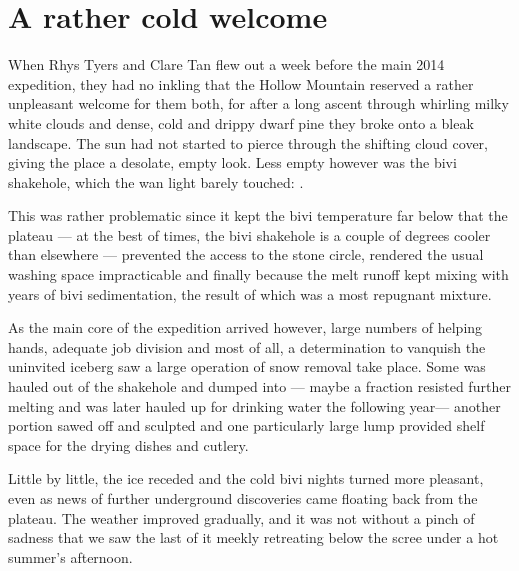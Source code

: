 

\section{A rather cold welcome}

When Rhys Tyers and Clare Tan flew out a week before the main 2014 expedition, they had no inkling that the Hollow Mountain reserved a rather unpleasant welcome for them both, for after a long ascent through whirling milky white clouds and dense, cold and drippy dwarf pine they broke onto a bleak landscape. The sun had not started to pierce through the shifting cloud cover, giving the place a desolate, empty look. Less empty however was the bivi shakehole, which the wan light barely touched: .

This was rather problematic since it kept the bivi temperature far below that the plateau --- at the best of times, the bivi shakehole is a couple of degrees cooler than elsewhere --- prevented the access to the stone circle, rendered the usual washing space impracticable and finally because the melt runoff kept mixing with years of bivi sedimentation, the result of which was a most repugnant mixture.

As the main core of the expedition arrived however, large numbers of helping hands, adequate job division and most of all, a determination to vanquish the uninvited iceberg saw a large operation of snow removal take place. Some was hauled out of the shakehole and dumped into  --- maybe a fraction resisted further melting and was later hauled up for drinking water the following year--- another portion sawed off and sculpted and one particularly large lump provided shelf space for the drying dishes and cutlery.

Little by little, the ice receded and the cold bivi nights turned more pleasant, even as news of further underground discoveries came floating back from the plateau. The weather improved gradually, and it was not without a pinch of sadness that we saw the last of it meekly retreating below the scree under a hot summer's afternoon.

